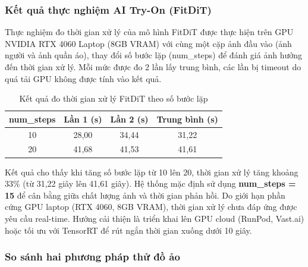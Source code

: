 \subsubsection{Kết quả thực nghiệm AI Try-On (FitDiT)}

Thực nghiệm đo thời gian xử lý của mô hình FitDiT được thực hiện trên
GPU NVIDIA RTX 4060 Laptop (8GB VRAM) với cùng một cặp ảnh đầu vào
(ảnh người và ảnh quần áo), thay đổi số bước lặp (num\_steps) để đánh
giá ảnh hưởng đến thời gian xử lý. Mỗi mức được đo 2 lần lấy trung bình,
các lần bị timeout do quá tải GPU không được tính vào kết quả.

\begin{table}[H]
\centering
\caption{Kết quả đo thời gian xử lý FitDiT theo số bước lặp}
\label{tab:fitdit_benchmark}
\begin{tabular}{|c|c|c|c|}
\hline
\textbf{num\_steps} & \textbf{Lần 1 (s)} & \textbf{Lần 2 (s)} & \textbf{Trung bình (s)} \\
\hline
10 & 28,00 & 34,44 & 31,22 \\
\hline
20 & 41,68 & 41,53 & 41,61 \\
\hline
\end{tabular}
\end{table}

Kết quả cho thấy khi tăng số bước lặp từ 10 lên 20, thời gian xử lý
tăng khoảng 33\% (từ 31,22 giây lên 41,61 giây). Hệ thống mặc định
sử dụng \textbf{num\_steps = 15} để cân bằng giữa chất lượng ảnh và
thời gian phản hồi. Do giới hạn phần cứng GPU laptop (RTX 4060, 8GB VRAM),
thời gian xử lý chưa đáp ứng được yêu cầu real-time. Hướng cải thiện
là triển khai lên GPU cloud (RunPod, Vast.ai) hoặc tối ưu với TensorRT
để rút ngắn thời gian xuống dưới 10 giây.

\subsubsection{So sánh hai phương pháp thử đồ ảo}

